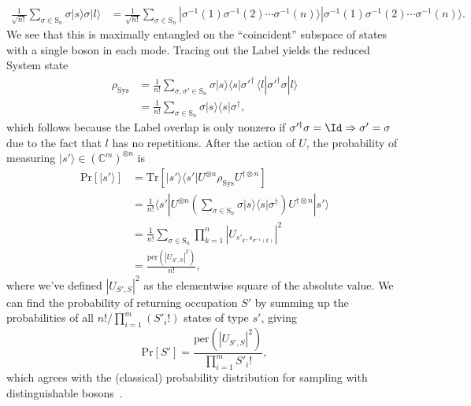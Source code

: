 \begin{align}\label{eq:ComDis}
\frac{1}{\sqrt{n!}} \sum_{\sigma \in \textrm{S}_n}\sigma|s\rangle\sigma|l\rangle
&=\frac{1}{\sqrt{n!}} \sum_{\sigma \in \textrm{S}_n}|\sigma^{-1}(1) \sigma^{-1}(2) \cdots \sigma^{-1}(n)\rangle |\sigma^{-1}(1) \sigma^{-1}(2) \cdots \sigma^{-1}(n)\rangle .
\end{align}
We see that this is maximally entangled on the ``coincident'' subspace of states with a single boson in each mode.
Tracing out the Label yields the reduced System state
\begin{align}
\rho_\mathrm{Sys}
 &= \frac{1}{n!} \sum_{\sigma, \sigma' \in \textrm{S}_n} \sigma|s\rangle\langle s|\sigma'^\dagger \, \langle l|\sigma'^\dagger \sigma|l\rangle \\
 &= \frac{1}{n!} \sum_{\sigma \in \textrm{S}_n} \sigma|s\rangle\langle s|\sigma^\dagger ,
\end{align}
which follows because the Label overlap is only nonzero if $\sigma'^\dag \sigma = \Id \Rightarrow \sigma'=\sigma$ due to the fact that $l$ has no repetitions.
After the action of $U$, the probability of measuring $|s'\rangle \in (\mathbb{C}^m)^{\otimes n}$ is
\begin{align}
\textrm{Pr}[|s'\rangle]
 &= \textrm{Tr}[|s'\rangle\langle s'|U^{\otimes n}\rho_\mathrm{Sys} U^{\dagger\otimes n}]\\
 &= \frac{1}{n!} \langle s'|U^{\otimes n}\left(\sum_{\sigma \in  \textrm{S}_n}\sigma|s\rangle\langle s|\sigma^\dagger\right)U^{\dagger\otimes n}|s'\rangle\\
 &= \frac{1}{n!} \sum_{\sigma \in  \textrm{S}_n} \prod_{k=1}^n |U_{s'_k,s_{\sigma^{-1}(k)}}|^2\\
 &= \frac{\textrm{per}(|U_{S',S}|^2)}{n!} ,
\end{align}
where we've defined $|U_{S',S}|^2$ as the elementwise square of the absolute value.
We can find the probability of returning occupation $S'$ by summing up the probabilities of all $n!/\prod_{i=1}^{m}(S'_i!)$ states of type $s'$, giving
\begin{equation}\label{eq:DistPer}
\textrm{Pr}[S'] = \frac{\textrm{per}(|U_{S',S}|^2)}{\prod_{i=1}^m S'_i!},
\end{equation}
which agrees with the (classical) probability distribution for sampling with distinguishable bosons~\cite{aaronson2014}.

